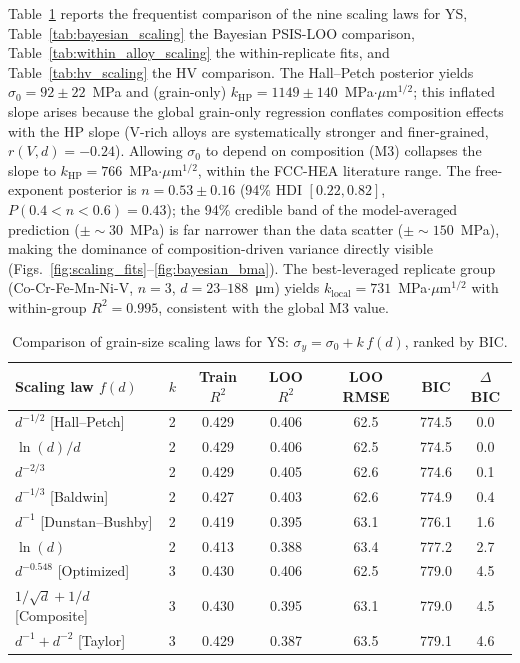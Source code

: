 \documentclass[11pt]{article}
\begin{document}
Table~\ref{tab:scaling} reports the frequentist comparison of the nine scaling laws for YS, Table~\ref{tab:bayesian_scaling} the Bayesian PSIS-LOO comparison, Table~\ref{tab:within_alloy_scaling} the within-replicate fits, and Table~\ref{tab:hv_scaling} the HV comparison. The Hall--Petch posterior yields $\sigma_0 = 92 \pm 22$~\si{MPa} and (grain-only) $k_\text{HP} = 1149 \pm 140$~MPa$\cdot\mu$m$^{1/2}$; this inflated slope arises because the global grain-only regression conflates composition effects with the HP slope (V-rich alloys are systematically stronger and finer-grained, $r(V, d) = -0.24$). Allowing $\sigma_0$ to depend on composition (M3) collapses the slope to $k_\text{HP} = 766$~MPa$\cdot\mu$m$^{1/2}$, within the FCC-HEA literature range. The free-exponent posterior is $n = 0.53 \pm 0.16$ (94\% HDI $[0.22, 0.82]$, $P(0.4 < n < 0.6) = 0.43$); the 94\% credible band of the model-averaged prediction ($\pm{\sim}30$~\si{MPa}) is far narrower than the data scatter ($\pm{\sim}150$~\si{MPa}), making the dominance of composition-driven variance directly visible (Figs.~\ref{fig:scaling_fits}--\ref{fig:bayesian_bma}). The best-leveraged replicate group (Co-Cr-Fe-Mn-Ni-V, $n = 3$, $d = 23$--$188$~\si{\micro\meter}) yields $k_\text{local} = 731$~MPa$\cdot\mu$m$^{1/2}$ with within-group $R^2 = 0.995$, consistent with the global M3 value.

\begin{table}[htb]
\centering
\caption{Comparison of grain-size scaling laws for YS: $\sigma_y = \sigma_0 + k\,f(d)$, ranked by BIC.}
\label{tab:scaling}
\small
\begin{tabular}{lcccccc}
\toprule
Scaling law $f(d)$ & $k$ & Train $R^2$ & LOO $R^2$ & LOO RMSE & BIC & $\Delta$BIC \\
\midrule
$d^{-1/2}$ [Hall--Petch] & 2 & 0.429 & 0.406 & 62.5 & 774.5 & 0.0 \\
$\ln(d)/d$ & 2 & 0.429 & 0.406 & 62.5 & 774.5 & 0.0 \\
$d^{-2/3}$ & 2 & 0.429 & 0.405 & 62.6 & 774.6 & 0.1 \\
$d^{-1/3}$ [Baldwin] & 2 & 0.427 & 0.403 & 62.6 & 774.9 & 0.4 \\
$d^{-1}$ [Dunstan--Bushby] & 2 & 0.419 & 0.395 & 63.1 & 776.1 & 1.6 \\
$\ln(d)$ & 2 & 0.413 & 0.388 & 63.4 & 777.2 & 2.7 \\
$d^{-0.548}$ [Optimized] & 3 & 0.430 & 0.406 & 62.5 & 779.0 & 4.5 \\
$1/\sqrt{d} + 1/d$ [Composite] & 3 & 0.430 & 0.395 & 63.1 & 779.0 & 4.5 \\
$d^{-1} + d^{-2}$ [Taylor] & 3 & 0.429 & 0.387 & 63.5 & 779.1 & 4.6 \\
\bottomrule
\end{tabular}
\end{table}
\end{document}
